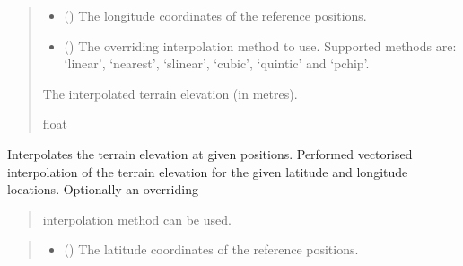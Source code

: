 \documentclass[letterpaper,10pt,english]{sphinxmanual}
\begin{document}
\begin{fulllineitems}
\begin{fulllineitems}
\begin{quote}
\begin{description}
\begin{itemize}
\item {} 
\sphinxAtStartPar
{} () \textendash{} The longitude coordinates of the reference positions.

\item {} 
\sphinxAtStartPar
{} () \textendash{} The overriding interpolation method to use. Supported
methods are: ‘linear’, ‘nearest’, ‘slinear’, ‘cubic’,
‘quintic’ and ‘pchip’.

\end{itemize}

\sphinxAtStartPar
The interpolated terrain elevation (in metres).

\sphinxAtStartPar
float

\end{description}\end{quote}

\end{fulllineitems}


\begin{fulllineitems}
\label{\detokenize{modules/earth/dted:qnav.earth.dted.DtedHandler.get_elevation_vec}}
\pysigstartsignatures
{}
\pysigstopsignatures
\sphinxAtStartPar
Interpolates the terrain elevation at given positions.
Performed vectorised interpolation of the terrain elevation for the
given latitude and longitude locations. Optionally an overriding
\begin{quote}

\sphinxAtStartPar
interpolation method can be used.
\end{quote}
\begin{quote}\begin{description}
\begin{itemize}
\item {} 
\sphinxAtStartPar
{} () \textendash{} The latitude coordinates of the reference positions.


\end{itemize}
\end{description}
\end{quote}
\end{fulllineitems}
\end{fulllineitems}
\end{document}
